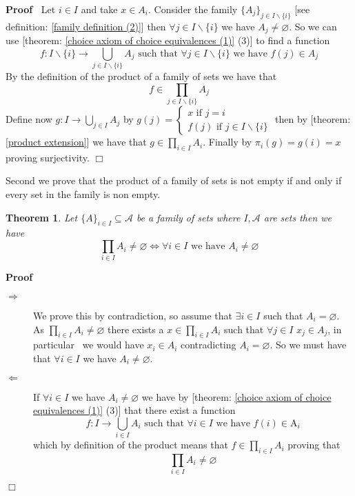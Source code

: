 \documentclass{book}
\newcommand{\Alpha}{\mathrm{A}}
\newenvironment{proof}{\noindent\textbf{Proof\ }}{\hspace*{\fill}$\Box$\medskip}
\newtheorem{theorem}{Theorem}
\begin{document}
\begin{proof}
  Let $i \in I$ and take $x \in A_i$. Consider the family $\{ A_j \}_{j \in
  I\backslash \{ i \}}$ [see definition: \ref{family definition (2)}] then
  $\forall j \in I\backslash \{ i \}$ we have $A_j \neq \varnothing$. So we
  can use [theorem: \ref{choice axiom of choice equivalences (1)} (3)] to find
  a function
  \[ f : I\backslash \{ i \} \rightarrow \bigcup_{j \in I\backslash \{ i \}}
     A_j \text{ such that $\forall j \in I\backslash \{ i \} \text{ we have $f
     (j) \in A_j$}$} \]
  By the definition of the product of a family of sets we have that
  \[ f \in \prod_{j \in I\backslash \{ i \}} A_j \]
  Define now $g : I \rightarrow \bigcup_{j \in I} A_j$ by $g (j) =
  \left\{\begin{array}{l}
    x \text{ if } j = i\\
    f (j) \text{ if } j \in I\backslash \{ i \}
  \end{array}\right.$ then by [theorem: \ref{product extension}] we have that
  $g \in \prod_{i \in I} A_i$. Finally by $\pi_i (g) = g (i) = x$ proving
  surjectivity.
\end{proof}

Second we prove that the product of a family of sets is not empty if and only
if every set in the family is non empty.

\begin{theorem}
  \label{product product is not empty}Let $\{ A \}_{i \in I} \subseteq
  \mathcal{A}$ be a family of sets where $I, \mathcal{A}$ are sets then we
  have
  \[ \prod_{i \in I} A_i \neq \varnothing \Leftrightarrow \forall i \in I
     \text{ we have } A_i \neq \varnothing \]
\end{theorem}

\begin{proof}
  
  \begin{description}
    \item[$\Rightarrow$] We prove this by contradiction, so assume that
    $\exists i \in I$ such that $A_i = \varnothing$. As $\prod_{i \in I} A_i
    \neq \varnothing$ there exists a $x \in \prod_{i \in I} A_i$ such that
    $\forall j \in I$ $x_j \in A_j$, in particular \ we would have $x_i \in
    A_i$ contradicting $A_i = \varnothing$. So we must have that $\forall i
    \in I$ we have $A_i \neq \varnothing$.
    
    \item[$\Leftarrow$] If $\forall i \in I$ we have $A_i \neq \varnothing$ we
    have by [theorem: \ref{choice axiom of choice equivalences (1)} (3)] that
    there exist a function
    \[ f : I \rightarrow \bigcup_{i \in I} A_i \text{ such that } \forall i
       \in I \text{ we have } f (i) \in \Alpha_i \]
    which by definition of the product means that $f \in \prod_{i \in I} A_i$
    proving that
    \[ \prod_{i \in I} A_i \neq \varnothing \]
  \end{description}
\end{proof}
\end{document}
